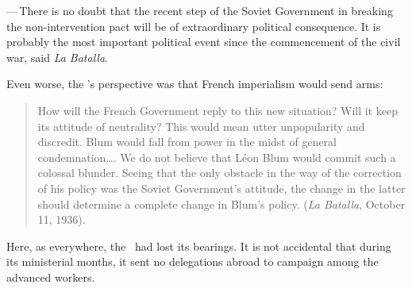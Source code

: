 —\,There is no doubt that the recent step of the Soviet Government in breaking the non-intervention pact will be of extraordinary political consequence. It is probably the most important political event since the commencement of the civil war, said \emph{La Batalla}.

\medskip

Even worse, the \POUM’s perspective was that French imperialism would send arms:

\begin{quotation}
  How will the French Government reply to this new situation? Will it keep its attitude of neutrality? This would mean utter unpopularity and discredit. Blum would fall from power in the midst of general condemnation\dots. We do not believe that L\'eon Blum would commit such a colossal blunder. Seeing that the only obstacle in the way of the correction of his policy was the Soviet Government’s attitude, the change in the latter should determine a complete change in Blum’s policy. (\emph{La Batalla}, October 11, 1936).
\end{quotation}

Here, as everywhere, the \POUM\ had lost its bearings. It is not accidental that during its ministerial months, it sent no delegations abroad to campaign among the advanced workers.